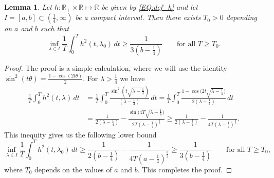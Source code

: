 \documentclass[11pt,twoside,reqno]{amsart}
\newcommand{\R}{\mathbb{R}}
\newcommand{\1}{\mathrm{\mathbf{1}}}
\numberwithin{equation}{section}
\theoremstyle{plain}
\newtheorem{lemma}[thm]{Lemma}
\theoremstyle{definition}
\theoremstyle{remark}
\begin{document}
\begin{lemma}\label{LE:lower_bound_h(t,lambda)}
    Let $h:\R_+\times \R \mapsto \R$ be given by \eqref{EQ:def_h} and let $I=[a,b]\subset (\frac14,\infty)$ be a compact interval. Then there exists $T_0>0$ depending on $a$ and $b$ such that
    \begin{equation*}
        \inf_{\lambda\in I}\frac{1}{T} \int_0^T h^2(t,\lambda_0) \, d t \geq \frac{1}{3(b -\frac{1}{4})} \qquad\text{for all $T\geq T_0$}.
    \end{equation*}
\end{lemma}

\begin{proof}
The proof is a simple calculation, where we will use the identity $\sin^2(t\theta) = \frac{1-\cos(2t\theta)}{2} $. For $\lambda>\frac{1}{4}$ we have
    \begin{equation*}
    \begin{aligned}
    \frac{1}{T} \int_0^T h^2(t,\lambda) \, d t  
    &=\frac{1}{T} \int_0^T \frac{\sin^2(t \sqrt{\lambda - \frac{1}{4}})}{(\lambda -\frac{1}{4})} \, d t 
    =  \frac{1}{T} \int_0^T \frac{1- \cos\big(2t\sqrt{\lambda - \frac{1}{4}})}{2(\lambda -\frac{1}{4})}  \, d t
    \\
    &=  \frac{1}{2(\lambda -\frac{1}{4})} -   \frac{\sin\big(4T\sqrt{\lambda - \frac{1}{4}})}{2T(\lambda - \frac{1}{4})^{\frac32}}  \geq \frac{1}{2(\lambda -\frac{1}{4})} -   \frac{1}{4T(\lambda - \frac{1}{4})^{\frac32}}. 
    \end{aligned}
\end{equation*}
This inequity gives us the following lower bound 
\begin{equation*}
        \inf_{\lambda\in I}\frac{1}{T} \int_0^T h^2(t,\lambda_0) \, d t \geq \frac{1}{2(b -\frac{1}{4})} -   \frac{1}{4T(a - \frac{1}{4})^{\frac32}} \geq \frac{1}{3(b -\frac{1}{4})} \qquad\text{for all $T\geq T_0$,}
\end{equation*}
where $T_0$ depends on the values of $a$ and $b$. This completes the proof. 
\end{proof}
\end{document}
